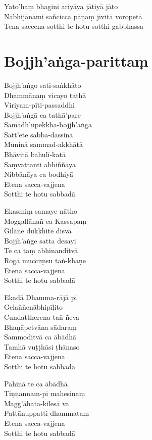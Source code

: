 
\begin{paritta}
Yato'haṃ bhagini ariyāya jātiyā jāto\\
Nābhijānāmi sañcicca pāṇaṃ jīvitā voropetā\\
Tena saccena sotthi te hotu sotthi gabbhassa

\end{paritta}

\clearpage

\chapter{Bojjh'aṅga-parittaṃ}%


\begin{paritta}
Bojjh'aṅgo sati-saṅkhāto\\
Dhammānaṃ vicayo tathā\\
Viriyam-pīti-passaddhi\\
Bojjh'aṅgā ca tathā'pare\\
Samādh'upekkha-bojjh'aṅgā\\
Satt'ete sabba-dassinā\\
Muninā sammad-akkhātā\\
Bhāvitā bahulī-katā\\
Saṃvattanti abhiññāya\\
Nibbānāya ca bodhiyā\\
Etena sacca-vajjena\\
Sotthi te hotu sabbadā

Ekasmiṃ samaye nātho\\
Moggallānañ-ca Kassapaṃ\\
Gilāne dukkhite disvā\\
Bojjh'aṅge satta desayi\\
Te ca taṃ abhinanditvā\\
Rogā mucciṃsu taṅ-khaṇe\\
Etena sacca-vajjena\\
Sotthi te hotu sabbadā

Ekadā Dhamma-rājā pi\\
Gelaññenābhipīḷito\\
Cundattherena tañ-ñeva\\
Bhaṇāpetvāna sādaraṃ\\
Sammoditvā ca ābādhā\\
Tamhā vuṭṭhāsi ṭhānaso\\
Etena sacca-vajjena\\
Sotthi te hotu sabbadā

Pahīnā te ca ābādhā\\
Tiṇṇannam-pi mahesinaṃ\\
Magg'āhata-kilesā va\\
Pattānuppatti-dhammataṃ\\
Etena sacca-vajjena\\
Sotthi te hotu sabbadā

\end{paritta}


